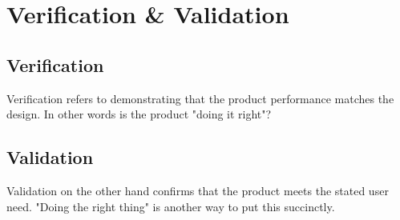 \chapter{Verification \& Validation}

\section{Verification}

Verification refers to demonstrating that the product performance matches the design. In other words is the product "doing it right"?

\section{Validation}

Validation on the other hand confirms that the product meets the stated user need. "Doing the right thing" is another way to put this succinctly.